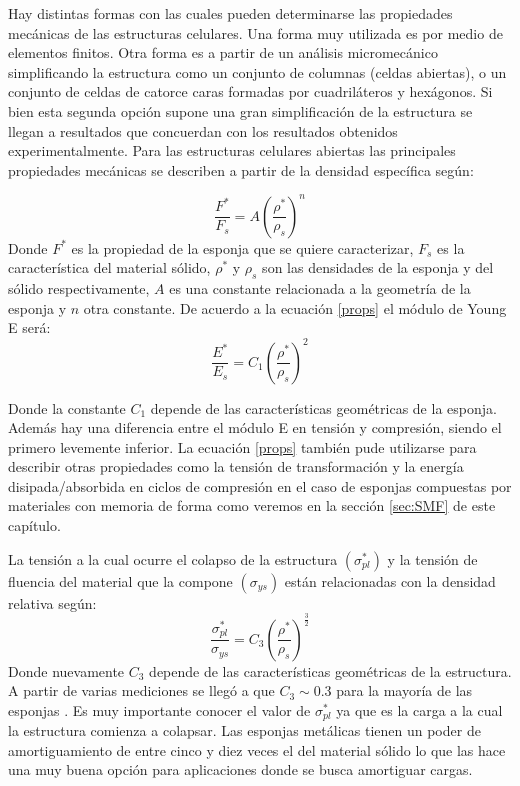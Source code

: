 \documentclass[a4paper,12pt,fleqn,twoside,openany]{book}
\begin{document}
Hay distintas formas con las cuales pueden determinarse las propiedades mecánicas de las estructuras celulares. Una forma muy utilizada es por medio 
de elementos finitos. Otra forma
es a partir de un análisis micromecánico simplificando la estructura como un conjunto de columnas (celdas abiertas), o un conjunto de celdas de catorce caras formadas por cuadriláteros y hexágonos. Si bien esta segunda opción supone una gran simplificación de la estructura se llegan a resultados que concuerdan con los 
resultados obtenidos experimentalmente. Para las estructuras celulares abiertas las principales propiedades mecánicas se describen a partir de la densidad específica \cite{duering} según:

\begin{equation}
\frac{F^*}{F_s}=A \left(\frac{\rho^*}{\rho_s}\right)^n \label{props} 
\end{equation}
Donde $F^*$ es la propiedad de la esponja que se quiere caracterizar, $F_s$ es la característica del material sólido, $\rho^*$ y $\rho_s$ son las 
densidades de la esponja y del sólido respectivamente, $A$ es una constante relacionada a la geometría de la esponja y $n$ otra constante. De acuerdo 
a la ecuación \ref{props} el módulo de Young E \cite{duering} será:
\begin{equation}
\frac{E^*}{E_s}=C_1 \left(\frac{\rho^*}{\rho_s}\right)^2 \label{propsE}  
\end{equation}

Donde la constante $C_1$ depende de las características geométricas de la esponja. 
Además hay una diferencia entre el módulo E en tensión y compresión, siendo el primero levemente inferior. La ecuación \ref{props} también pude utilizarse 
para describir otras propiedades como la tensión de transformación y la energía disipada/absorbida en ciclos de compresión en el caso de esponjas 
compuestas por materiales con memoria de forma como veremos en la sección \ref{sec:SMF} de este capítulo. 


La tensión a la cual ocurre el colapso de la estructura $(\sigma^*_{pl})$ y la tensión de fluencia del material que la compone $(\sigma_{ys})$  
están relacionadas con la densidad relativa \cite{duering} según:
\begin{equation}
 \frac{\sigma^*_{pl}}{\sigma_{ys}}=C_3 \left(\frac{\rho^*}{\rho_s} \right)^{\frac{3}{2}}
\end{equation}
Donde nuevamente $C_3$ depende de las características geométricas de la estructura. A partir de varias mediciones se llegó a que $C_3 \sim 0.3$ para
la mayoría de las esponjas \cite{gibson}. 
Es muy importante conocer el valor de $\sigma^*_{pl}$ ya que es la carga a la cual la estructura comienza a colapsar.  Las esponjas metálicas tienen 
un poder de amortiguamiento de entre cinco y diez veces el del material sólido \cite{design} lo que las hace una muy buena opción para aplicaciones 
donde se busca amortiguar cargas. 
\end{document}
